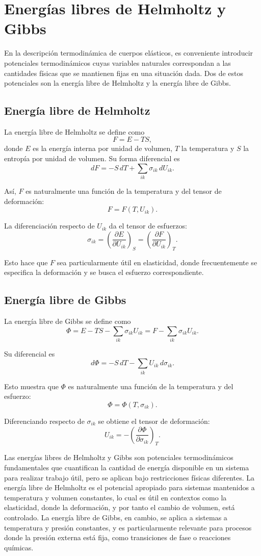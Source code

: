 \section{Energías libres de Helmholtz y Gibbs}

En la descripción termodinámica de cuerpos elásticos, es conveniente introducir potenciales termodinámicos cuyas variables naturales correspondan a las cantidades físicas que se mantienen fijas en una situación dada. Dos de estos potenciales son la energía libre de Helmholtz y la energía libre de Gibbs.

\subsection{Energía libre de Helmholtz}

La energía libre de Helmholtz se define como
$$ F = E - TS, $$
donde $E$ es la energía interna por unidad de volumen, $T$ la temperatura y $S$ la entropía por unidad de volumen. Su forma diferencial es
$$ dF = -S\,dT + \sum_{ik}\sigma_{ik}\,dU_{ik}. $$

Así, $F$ es naturalmente una función de la temperatura y del tensor de deformación:
$$ F = F(T,U_{ik}). $$

La diferenciación respecto de $U_{ik}$ da el tensor de esfuerzos:
$$ \sigma_{ik} = \left(\frac{\partial E}{\partial U_{ik}}\right)_S = \left(\frac{\partial F}{\partial U_{ik}}\right)_T. $$

Esto hace que $F$ sea particularmente útil en elasticidad, donde frecuentemente se especifica la deformación y se busca el esfuerzo correspondiente.

\subsection{Energía libre de Gibbs}

La energía libre de Gibbs se define como
$$ \Phi = E - TS - \sum_{ik}\sigma_{ik}U_{ik} = F - \sum_{ik}\sigma_{ik}U_{ik}. $$

Su diferencial es
$$ d\Phi = -S\,dT - \sum_{ik}U_{ik}\,d\sigma_{ik}. $$

Esto muestra que $\Phi$ es naturalmente una función de la temperatura y del esfuerzo:
$$ \Phi = \Phi(T,\sigma_{ik}). $$

Diferenciando respecto de $\sigma_{ik}$ se obtiene el tensor de deformación:
$$ U_{ik} = -\left(\frac{\partial \Phi}{\partial \sigma_{ik}}\right)_T. $$

Las energías libres de Helmholtz y Gibbs son potenciales termodinámicos fundamentales que cuantifican la cantidad de energía disponible en un sistema para realizar trabajo útil, pero se aplican bajo restricciones físicas diferentes. La energía libre de Helmholtz es el potencial apropiado para sistemas mantenidos a temperatura y volumen constantes, lo cual es útil en contextos como la elasticidad, donde la deformación, y por tanto el cambio de volumen, está controlado. La energía libre de Gibbs, en cambio, se aplica a sistemas a temperatura y presión constantes, y es particularmente relevante para procesos donde la presión externa está fija, como transiciones de fase o reacciones químicas.

